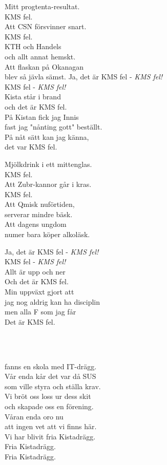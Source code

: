 Mitt progtenta-resultat. \\
KMS fel. \\
Att CSN försvinner snart. \\
KMS fel. \\
KTH och Handels \\
och allt annat hemskt. \\
Att flaskan på Okanagan \\
blev så jävla sämst.
\newpage
Ja, det är KMS fel - \textit{KMS fel!} \\
KMS fel - \textit{KMS fel!} \\
Kista står i brand \\
och det är KMS fel. \\
På Kistan fick jag Innis \\
fast jag "nånting gott" beställt. \\
På nåt sätt kan jag känna, \\
det var KMS fel.

Mjölkdrink i ett mittenglas. \\
KMS fel. \\
Att Zubr-kannor går i kras. \\
KMS fel. \\
Att Qmisk nuförtiden, \\
serverar mindre bäsk. \\
Att dagens ungdom \\
numer bara köper alkoläsk.

Ja, det är KMS fel - \textit{KMS fel!}\\
KMS fel - \textit{KMS fel!}\\
Allt är upp och ner \\
Och det är KMS fel. \\
Min uppväxt gjort att \\
jag nog aldrig kan ha disciplin \\
men alla F som jag får \\ 
Det är KMS fel. 


\newpage 


 \\       
\author{Text: Lucifer}

  \\ 
fanns en skola med IT-drägg.  \\ 
Vår enda kår det var då SUS  \\ 
som ville styra och ställa krav.  \\ 
Vi bröt oss loss ur dess skit \\ 
och skapade oss en förening. \\ 
Våran enda oro nu \\ 
att ingen vet att vi finns här. \\
\leftrepeat Vi har blivit fria Kistadrägg. \\ 
Fria Kistadrägg. \\ 
Fria Kistadrägg. \rightrepeat

